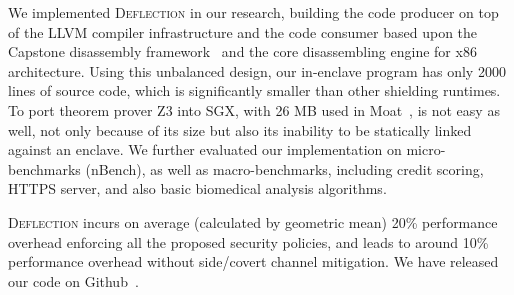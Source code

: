 We implemented \textsc{Deflection} in our research, building the code producer on top of the LLVM compiler infrastructure and the code consumer based upon the Capstone disassembly framework~\cite{capstone} and the core disassembling engine for x86 architecture. 
Using this unbalanced design, our in-enclave program has only 2000 lines of source code, which is significantly smaller than other shielding runtimes. 
To port theorem prover Z3 into SGX, with 26 MB used in Moat~\cite{sinha2015moat}, is not easy as well, not only because of its size but also its inability to be statically linked against an enclave.
We further evaluated our implementation on micro-benchmarks (nBench), as well as macro-benchmarks, including credit scoring, HTTPS server, and also basic biomedical analysis algorithms.


\textsc{Deflection} incurs on average (calculated by geometric mean) 20\% performance overhead
enforcing all the proposed security policies, and leads to around 10\% performance overhead
without side/covert channel mitigation.
We have released our code on Github~\cite{our-prototype}.





